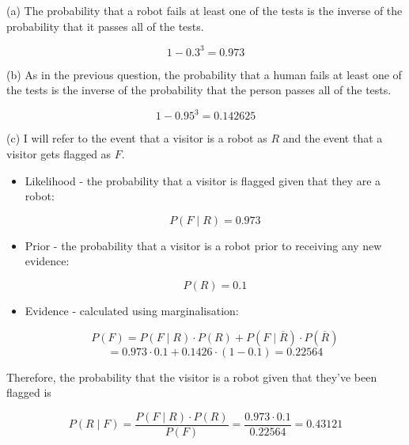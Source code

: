 \documentclass[12pt]{article}
\begin{document}
\noindent (a) The probability that a robot fails at least one of the tests is the inverse of the probability that it passes all of the tests.

$$ 1 - 0.3^3 = 0.973 $$

\noindent (b) As in the previous question, the probability that a human fails at least one of the tests is the inverse of the probability that the person passes all of the tests.

$$ 1 - 0.95^3 = 0.142625 $$

\noindent (c) I will refer to the event that a visitor is a robot as $R$ and the event that a visitor gets flagged as $F$.

\begin{itemize}

    \item Likelihood - the probability that a visitor is flagged given that they are a robot:
    
    $$ P(F \mid R) = 0.973 $$
    
    \item Prior - the probability that a visitor is a robot prior to receiving any new evidence:
    
    $$ P(R) = 0.1 $$
    
    \item Evidence - calculated using marginalisation:

    $$ P(F) = P(F \mid R) \cdot P(R) + P(F \mid \overline{R}) \cdot P(\overline{R}) $$
    $$ = 0.973 \cdot 0.1 + 0.1426 \cdot (1 - 0.1) = 0.22564 $$
    
\end{itemize}

\indent Therefore, the probability that the visitor is a robot given that they've been flagged is

$$ P(R \mid F) = \frac{P(F \mid R) \cdot P(R)}{P(F)} = \frac{0.973 \cdot 0.1}{0.22564} = 0.43121 $$
\end{document}
